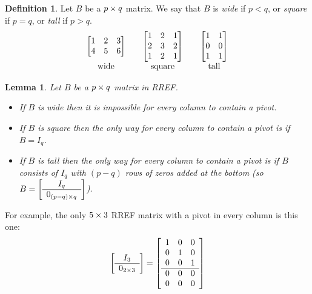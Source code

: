 \documentclass[reqno]{amsart}
\newtheorem{lemma}[theorem]{Lemma}
\theoremstyle{definition}
\newtheorem{definition}[theorem]{Definition}
\newcommand{\dfn}[1]{\emph{{#1}}\index{#1}}
\begin{document}
\begin{definition}\label{defn-wide}
 Let $B$ be a $p\times q$ matrix.  We say that $B$ is \dfn{wide} if
 $p<q$, or \dfn{square} if $p=q$, or \dfn{tall} if $p>q$.
 \[ \begin{array}{ccccc}
     \left[\begin{matrix} 1 & 2 & 3 \\ 4 & 5 & 6 \end{matrix}\right] & &
     \left[\begin{matrix} 1 & 2 & 1 \\ 2 & 3 & 2 \\ 1 & 2 & 1 \end{matrix}\right] & &
     \left[\begin{matrix} 1 & 1 \\ 0 & 0 \\ 1 & 1 \end{matrix}\right] \\
     \text{ wide } & & \text{ square } & & \text{ tall }
    \end{array}
 \]
\end{definition}
\begin{lemma}\label{lem-pivots-everywhere}
 Let $B$ be a $p\times q$ matrix in RREF.
 \begin{itemize}
  \item[(a)] If $B$ is wide then it is impossible for every column to
   contain a pivot.
  \item[(b)] If $B$ is square then the only way for every column to
   contain a pivot is if $B=I_q$.
  \item[(c)] If $B$ is tall  then the only way for every column to
   contain a pivot is if $B$ consists of $I_q$ with $(p-q)$ rows of
   zeros added at the bottom (so
   $B=\left[\begin{array}{c} I_q \\ \hline 0_{(p-q)\times q}
      \end{array}\right]$).
 \end{itemize}
\end{lemma}

For example, the only $5\times 3$ RREF matrix with a pivot in every
column is this one:
\[ \left[\begin{array}{c}
      I_3 \\ \hline 0_{2\times 3} 
   \end{array}\right] =
   \left[\begin{array}{ccc}
    1 & 0 & 0 \\
    0 & 1 & 0 \\
    0 & 0 & 1 \\ \hline
    0 & 0 & 0 \\
    0 & 0 & 0
   \end{array}\right]
\]
\end{document}
